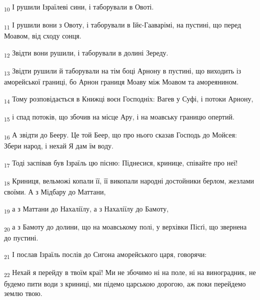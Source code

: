 \begin{tcolorbox}
\textsubscript{10} І рушили Ізраїлеві сини, і таборували в Овоті.
\end{tcolorbox}
\begin{tcolorbox}
\textsubscript{11} І рушили вони з Овоту, і таборували в Ійє-Гааварімі, на пустині, що перед Моавом, від сходу сонця.
\end{tcolorbox}
\begin{tcolorbox}
\textsubscript{12} Звідти вони рушили, і таборували в долині Зереду.
\end{tcolorbox}
\begin{tcolorbox}
\textsubscript{13} Звідти рушили й таборували на тім боці Арнону в пустині, що виходить із аморейської границі, бо Арнон границя Моаву між Моавом та амореянином.
\end{tcolorbox}
\begin{tcolorbox}
\textsubscript{14} Тому розповідається в Книжці воєн Господніх: Вагев у Суфі, і потоки Арнону,
\end{tcolorbox}
\begin{tcolorbox}
\textsubscript{15} і спад потоків, що збочив на місце Ару, і на моавську границю опертий.
\end{tcolorbox}
\begin{tcolorbox}
\textsubscript{16} А звідти до Бееру. Це той Беер, що про нього сказав Господь до Мойсея: Збери народ, і нехай Я дам їм воду.
\end{tcolorbox}
\begin{tcolorbox}
\textsubscript{17} Тоді заспівав був Ізраїль цю пісню: Піднесися, кринице, співайте про неї!
\end{tcolorbox}
\begin{tcolorbox}
\textsubscript{18} Криниця, вельможі копали її, її викопали народні достойники берлом, жезлами своїми. А з Мідбару до Маттани,
\end{tcolorbox}
\begin{tcolorbox}
\textsubscript{19} а з Маттани до Нахаліїлу, а з Нахаліїлу до Бамоту,
\end{tcolorbox}
\begin{tcolorbox}
\textsubscript{20} а з Бамоту до долини, що на моавському полі, у верхівки Пісґі, що звернена до пустині.
\end{tcolorbox}
\begin{tcolorbox}
\textsubscript{21} І послав Ізраїль послів до Сигона аморейського царя, говорячи:
\end{tcolorbox}
\begin{tcolorbox}
\textsubscript{22} Нехай я перейду в твоїм краї! Ми не збочимо ні на поле, ні на виноградник, не будемо пити води з криниці, ми підемо царською дорогою, аж поки перейдемо землю твою.
\end{tcolorbox}
